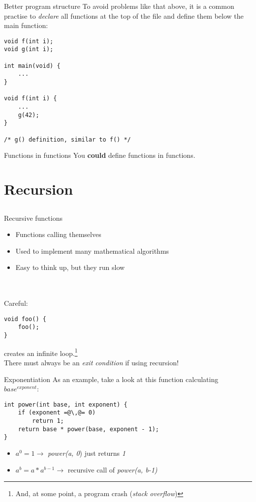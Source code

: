 \begin{frame}[fragile]{Better program structure}
	To avoid problems like that above, it is a common practise to \textit{declare} all functions at the top of the file and define them below the main function:
	\begin{lstlisting}
void f(int i);
void g(int i);

int main(void) {
	...
}

void f(int i) {
	...
	g(42);
}

/* g() definition, similar to f() */
\end{lstlisting}
\end{frame}
\begin{frame}{Functions in functions}
	You \textbf{could} define functions in functions.\footnotemark
	
\end{frame}
\section{Recursion}
\subsection{}
\begin{frame}[fragile]{Recursive functions}
	\begin{itemize}
		\item Functions calling themselves
		\item Used to implement many mathematical algorithms
		\item Easy to think up, but they run slow
	\end{itemize} \ \\ \ \\
	Careful:
	\begin{lstlisting}
void foo() {
	foo();
}
\end{lstlisting}
	creates an infinite loop.\footnote{And, at some point, a program crash (\textit{stack overflow})} \\
	There must always be an \textit{exit condition} if using recursion!
\end{frame}
\begin{frame}[fragile]{Exponentiation}
As an example, take a look at this function calculating $base^{exponent}$:
	\begin{lstlisting}
int power(int base, int exponent) {
	if (exponent =@\,@= 0)
		return 1;
	return base * power(base, exponent - 1);
}
\end{lstlisting}
	\begin{itemize}
		\item $a^{0} = 1 \rightarrow$ \textit{power(a, 0}) just returns \textit{1}
		\item $a^{b} = a * a^{b-1} \rightarrow$ recursive call of \textit{power(a, b-1)}
	\end{itemize}
\end{frame}

